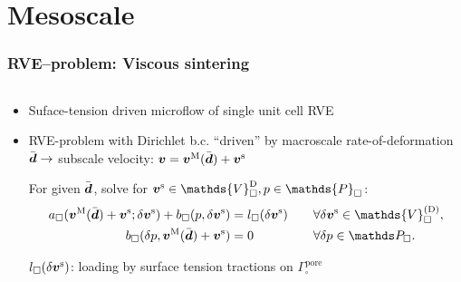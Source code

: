 \documentclass[11pt]{beamer} %
\begin{document}
\section{Mesoscale}
\newcommand{\macroscale}{\mathrm{M}}
\newcommand{\subscale}{\mathrm{s}}
\begin{frame}
 \frametitle{RVE--problem: Viscous sintering}
 \begin{center}
  \begin{columns}
   \centering
    \resizebox{!}{0.8\textwidth}{}
   \centering
    \resizebox{!}{0.8\textwidth}{}
  \end{columns}
 \end{center}
 \begin{itemize}
  \item Suface-tension driven microflow of single unit cell RVE
  \item RVE-problem with Dirichlet b.c. ``driven'' by macroscale rate-of-deformation $\bar{\boldsymbol{d}}\rightarrow$ subscale velocity:
	$\ts v = \ts v^\macroscale(\bar{\ts d})+\ts v^\subscale$

 For given $\bar{\boldsymbol{d}}$, solve for $\ts v^\subscale \in \mathds{V}_\square^{\mathrm{D}}, p \in \mathds{P}_\square$:
 \begin{align*}
  a_\square(\ts v^\macroscale(\bar{\ts d})+\ts v^\subscale; \delta\ts v^\subscale) + b_\square(p,\delta \ts v^\subscale) &= l_\square(\delta \ts v^\subscale)\quad &&\forall \delta \ts v^\subscale \in \mathds{V}_\square^{(\mathrm{D})},\\
 b_\square(\delta p,\ts v^\macroscale(\bar{\ts d}) + \ts v^\subscale) &= 0 && \forall \delta p\in \mathds P_\square.
 \end{align*}

 $l_\square(\delta \ts v^\subscale)$: loading by surface tension tractions on $\Gamma_\square^{\text{pore}}$
 \end{itemize}
\end{frame}

\end{document}
